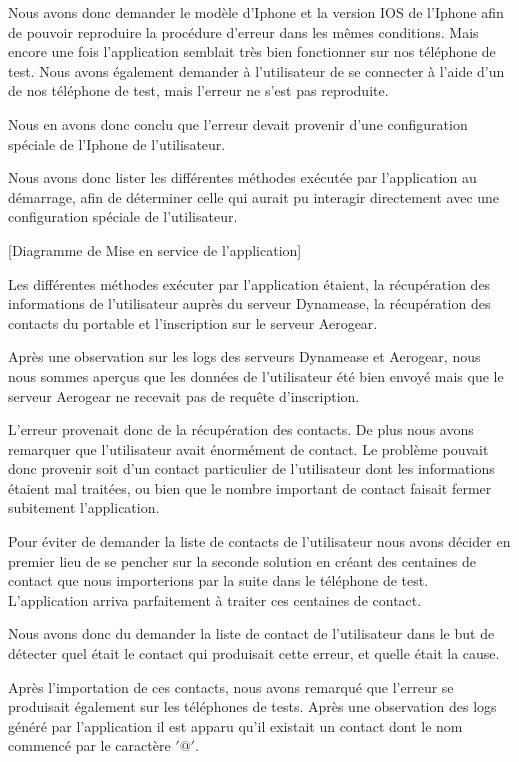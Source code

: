 Nous avons donc demander le modèle d'Iphone et la version IOS de l'Iphone afin de pouvoir reproduire la procédure d'erreur dans les mêmes conditions. Mais encore une fois l'application semblait très bien fonctionner sur nos téléphone de test. Nous avons également demander à l'utilisateur de se connecter à l'aide d'un de nos téléphone de test, mais l'erreur ne s'est pas reproduite.

Nous en avons donc conclu que l'erreur devait provenir d'une configuration spéciale de l'Iphone de l'utilisateur.

Nous avons donc lister les différentes méthodes exécutée par l'application au démarrage, afin de déterminer celle qui aurait pu interagir directement avec une configuration spéciale de l'utilisateur.

[Diagramme de Mise en service de l'application]

Les différentes méthodes exécuter par l'application étaient, la récupération des informations de l'utilisateur auprès du serveur Dynamease, la récupération des contacts du portable et l'inscription sur le serveur Aerogear.

Après une observation sur les logs des serveurs Dynamease et Aerogear, nous nous sommes aperçus que les données de l'utilisateur été bien envoyé mais que le serveur Aerogear ne recevait pas de requête d'inscription.

L'erreur provenait donc de la récupération des contacts. De plus nous avons remarquer que l'utilisateur avait énormément de contact. Le problème pouvait donc provenir soit d'un contact particulier de l'utilisateur dont les informations étaient mal traitées, ou bien que le nombre important de contact faisait fermer subitement l'application.

Pour éviter de demander la liste de contacts de l'utilisateur nous avons décider en premier lieu de se pencher sur la seconde solution en créant des centaines de contact que nous importerions par la suite dans le téléphone de test. L'application arriva parfaitement à traiter ces centaines de contact.

Nous avons donc du demander la liste de contact de l'utilisateur dans le but de détecter quel était le contact qui produisait cette erreur, et quelle était la cause.

Après l'importation de ces contacts, nous avons remarqué que l'erreur se produisait également  sur les téléphones de tests. Après une observation des logs généré par l'application il est apparu qu'il existait un contact dont le nom commencé par le caractère $'@'$.

